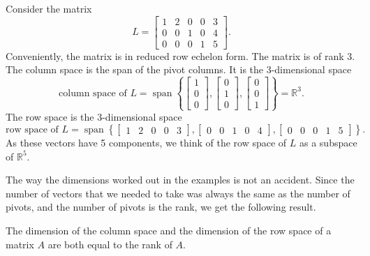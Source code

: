 \begin{example}
Consider the matrix 
\begin{equation*}
L =
\begin{bmatrix}
{1} & 2 & 0 & 0 & 3 \\
0 & 0 & {1} & 0 & 4 \\
0 & 0 & 0 & {1} & 5
\end{bmatrix} .
\end{equation*}
Conveniently, the matrix is in reduced row echelon form.
The matrix is of rank 3.
The column space is the span of the pivot columns.
It is the 3-dimensional space
\begin{equation*}
\text{column space of $L$} =
\operatorname{span} \left\{
\begin{bmatrix}
1 \\
0 \\
0
\end{bmatrix} 
,
\begin{bmatrix}
0 \\
1 \\
0
\end{bmatrix} 
,
\begin{bmatrix}
0 \\
0 \\
1
\end{bmatrix} 
\right\}
= {\mathbb{R}}^3 .
\end{equation*}
The row space is the 3-dimensional space
\begin{equation*}
\text{row space of $L$} =
\operatorname{span} \left\{
\begin{bmatrix}
1 & 2 & 0 & 0 & 3
\end{bmatrix} 
,
\begin{bmatrix}
0 & 0 & 1 & 0 & 4
\end{bmatrix} 
,
\begin{bmatrix}
0 & 0 & 0 & 1 & 5
\end{bmatrix} 
\right\} .
\end{equation*}
As these vectors have 5 components, we think of the row space of $L$
as a subspace of ${\mathbb{R}}^5$.
\end{example}

The way the dimensions worked out in the examples is not 
an accident.  Since the number of vectors that we needed to take
was always the same as the number of pivots, and the number of pivots
is the rank, we get the following result.

\begin{theorem}[Rank]
The dimension of the column space and the dimension of the row space 
of a matrix $A$ are both equal to the rank of $A$.
\end{theorem}

